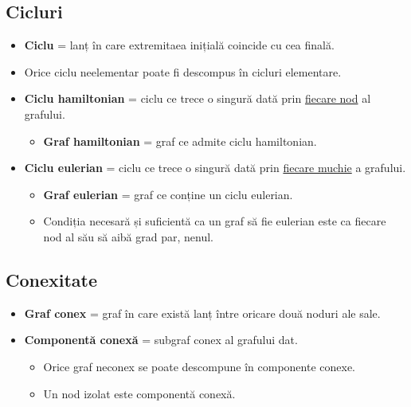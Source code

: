 \documentclass{article}
\begin{document}
\subsection*{Cicluri}
\begin{itemize}
    \item \textbf{Ciclu} = lanț în care extremitaea inițială coincide cu cea finală.
    \item Orice ciclu neelementar poate fi descompus în cicluri elementare.
    \item \textbf{Ciclu hamiltonian} = ciclu ce trece o singură dată prin \underline{fiecare nod} al grafului.
    \begin{itemize}
        \item \textbf{Graf hamiltonian} = graf ce admite ciclu hamiltonian.
    \end{itemize}
    \item \textbf{Ciclu eulerian} = ciclu ce trece o singură dată prin \underline{fiecare muchie} a grafului.
    \begin{itemize}
        \item \textbf{Graf eulerian} = graf ce conține un ciclu eulerian.
        \item Condiția necesară și suficientă ca un graf să fie eulerian este ca fiecare nod al său să aibă grad par, nenul.
    \end{itemize}
\end{itemize}
\subsection*{Conexitate}
\begin{itemize}
    \item \textbf{Graf conex} = graf în care există lanț între oricare două noduri ale sale.
    \item \textbf{Componentă conexă} = subgraf conex al grafului dat.
    \begin{itemize}
        \item Orice graf neconex se poate descompune în componente conexe.
        \item Un nod izolat este componentă conexă.
    \end{itemize}
\end{itemize}
\end{document}
